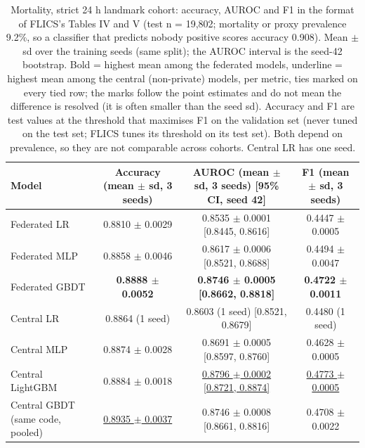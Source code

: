 \begin{table}[t]
\centering\small
\caption{Mortality, strict 24 h landmark cohort: accuracy, AUROC and F1 in the format of FLICS's Tables IV and V (test n = 19,802; mortality or proxy prevalence 9.2\%, so a classifier that predicts nobody positive scores accuracy 0.908). Mean $\pm$ sd over the training seeds (same split); the AUROC interval is the seed-42 bootstrap. Bold = highest mean among the federated models, underline = highest mean among the central (non-private) models, per metric, ties marked on every tied row; the marks follow the point estimates and do not mean the difference is resolved (it is often smaller than the seed sd). Accuracy and F1 are test values at the threshold that maximises F1 on the validation set (never tuned on the test set; FLICS tunes its threshold on its test set). Both depend on prevalence, so they are not comparable across cohorts. Central LR has one seed.}\label{tab:final_strict}
\begin{tabular}{lccc}
\toprule
Model & Accuracy (mean $\pm$ sd, 3 seeds) & AUROC (mean $\pm$ sd, 3 seeds) [95\% CI, seed 42] & F1 (mean $\pm$ sd, 3 seeds) \\
\midrule
Federated LR & 0.8810 $\pm$ 0.0029 & 0.8535 $\pm$ 0.0001 [0.8445, 0.8616] & 0.4447 $\pm$ 0.0005 \\
Federated MLP & 0.8858 $\pm$ 0.0046 & 0.8617 $\pm$ 0.0006 [0.8521, 0.8688] & 0.4494 $\pm$ 0.0047 \\
Federated GBDT & \textbf{0.8888 $\pm$ 0.0052} & \textbf{0.8746 $\pm$ 0.0005 [0.8662, 0.8818]} & \textbf{0.4722 $\pm$ 0.0011} \\
Central LR & 0.8864 (1 seed) & 0.8603 (1 seed) [0.8521, 0.8679] & 0.4480 (1 seed) \\
Central MLP & 0.8874 $\pm$ 0.0028 & 0.8691 $\pm$ 0.0005 [0.8597, 0.8760] & 0.4628 $\pm$ 0.0005 \\
Central LightGBM & 0.8884 $\pm$ 0.0018 & \underline{0.8796 $\pm$ 0.0002 [0.8721, 0.8874]} & \underline{0.4773 $\pm$ 0.0005} \\
Central GBDT (same code, pooled) & \underline{0.8935 $\pm$ 0.0037} & 0.8746 $\pm$ 0.0008 [0.8661, 0.8816] & 0.4708 $\pm$ 0.0022 \\
\bottomrule
\end{tabular}
\end{table}

